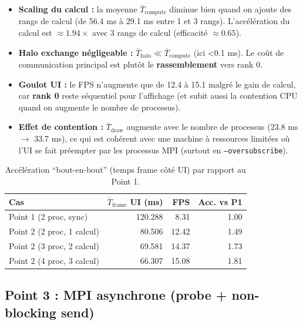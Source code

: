 \documentclass[11pt,a4paper]{article}
\begin{document}
\begin{itemize}[leftmargin=1.2em]
  \item \textbf{Scaling du calcul :} la moyenne $\overline{T}_{\text{compute}}$ diminue bien quand on ajoute des rangs de calcul
        (de 56.4 ms à 29.1 ms entre 1 et 3 rangs). L’accélération du calcul est $\approx 1.94\times$ avec 3 rangs de calcul
        (efficacité $\approx 0.65$).
  \item \textbf{Halo exchange négligeable :} $\overline{T}_{\text{halo}} \ll \overline{T}_{\text{compute}}$ (ici \textless 0.1 ms).
        Le coût de communication principal est plutôt le \textbf{rassemblement} vers rank 0.
  \item \textbf{Goulot UI :} le FPS n’augmente que de 12.4 à 15.1 malgré le gain de calcul, car \textbf{rank 0} reste séquentiel
        pour l’affichage (et subit aussi la contention CPU quand on augmente le nombre de processus).
  \item \textbf{Effet de contention :} $\overline{T}_{\text{draw}}$ augmente avec le nombre de processus (23.8 ms $\rightarrow$ 33.7 ms),
        ce qui est cohérent avec une machine à ressources limitées où l’UI se fait préempter par les processus MPI (surtout en \texttt{--oversubscribe}).
\end{itemize}

\begin{table}[H]
  \centering
  \small
  \caption{Accélération ``bout-en-bout'' (temps frame côté UI) par rapport au Point 1.}
  \label{tab:mpi-speedup-p1}
  \begin{tabular}{@{}lrrr@{}}
    \toprule
    Cas & $\overline{T}_{\text{frame}}$ UI (ms) & FPS & Acc. vs P1 \\
    \midrule
    Point 1 (2 proc, sync) & 120.288 & 8.31 & 1.00 \\
    Point 2 (2 proc, 1 calcul) & 80.506 & 12.42 & 1.49 \\
    Point 2 (3 proc, 2 calcul) & 69.581 & 14.37 & 1.73 \\
    Point 2 (4 proc, 3 calcul) & 66.307 & 15.08 & 1.81 \\
    \bottomrule
  \end{tabular}
\end{table}

\subsection{Point 3 : MPI asynchrone (probe + non-blocking send)}
\end{document}
